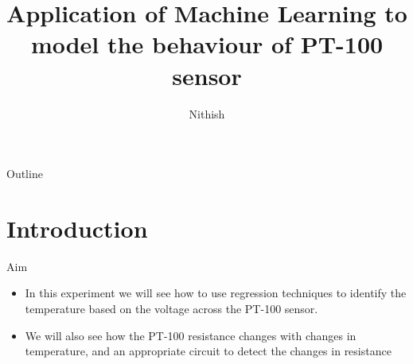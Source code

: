 \documentclass{beamer}
\title[Using PT100 to measuring the temperature]{Application of Machine Learning to model the behaviour of PT-100 sensor}
\author{Nithish}
\theoremstyle{remark}
\begin{document}
\begin{frame}
    \titlepage 
\end{frame}
\logo{}
\begin{frame}{Outline}
    \tableofcontents
\end{frame}
\section{Introduction}
\begin{frame}{Aim}
	\begin{itemize}
		\item In this experiment we will see how to use regression techniques to identify the temperature based on the voltage across the PT-100 sensor.
		\item We will also see how the PT-100 resistance changes with changes in temperature, and an appropriate circuit to detect the changes in resistance 
	\end{itemize}
\end{frame}
\end{document}
